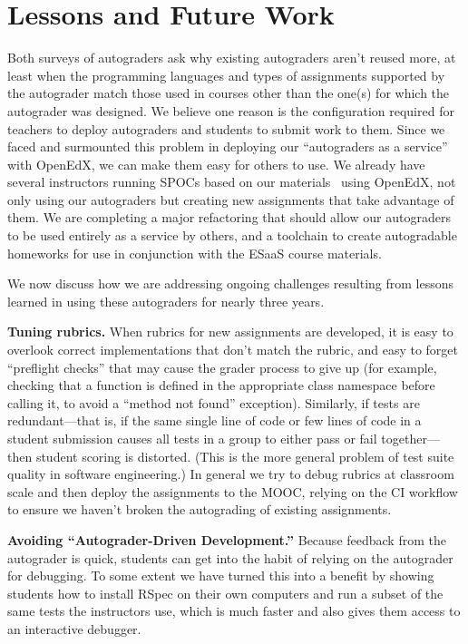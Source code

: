 \section{Lessons and Future Work}

Both  surveys of autograders ask why existing autograders aren't reused
more, at least when the programming languages and types of assignments supported by the
autograder match those used in courses other than the one(s) for which
the autograder was designed.
We believe one reason is the configuration required for teachers to
deploy autograders and
students to submit work to them.  Since we
faced and surmounted this problem in deploying our ``autograders as a
service'' with OpenEdX, we can make them easy for others to use.
We already have several instructors running SPOCs based on our
materials~\cite{moocs-spocs-TR} using OpenEdX, not only using our
autograders but creating new assignments that take advantage of them.
We are completing a major refactoring that should allow our autograders
to be used entirely as a service by others, and a toolchain to create
autogradable homeworks for use in conjunction with the ESaaS course
materials. 

We now discuss how we are addressing ongoing
challenges resulting from lessons learned in using these autograders for
nearly three years.

\textbf{Tuning rubrics.}
When rubrics for new assignments are developed, it is easy to overlook
correct implementations that don't match the rubric, and easy to forget
``preflight checks'' that may cause the grader process to give up (for
example, checking that a function is defined in the appropriate class
namespace before calling it, to avoid a ``method not found''
exception).  Similarly, if tests are
redundant---that is, if the same single line of code or few lines of
code in a student submission causes all tests in a group to either pass
or fail together---then student scoring is distorted.  (This is the more
general problem of test suite quality in software engineering.)
In general we try to debug rubrics at classroom scale and
then deploy the assignments to the MOOC, relying on the CI workflow to
ensure we haven't broken the autograding of existing assignments.

\textbf{Avoiding ``Autograder-Driven Development.''}
Because feedback from the autograder is quick, students can get into the
habit of relying on the autograder for debugging.  To some extent we
have turned this into a benefit by showing students how to install RSpec
on their own computers and run a subset of the same tests the
instructors use, which is much faster and also gives them access to an
interactive debugger.

